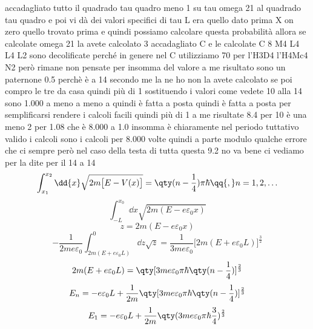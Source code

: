\begin{soluzione}
accadagliato tutto il quadrado tau quadro meno 1 su tau omega 21 al quadrado tau quadro e poi vi dà dei valori specifici di tau L era quello dato prima X on zero quello trovato prima e quindi possiamo calcolare questa probabilità allora se calcolate omega 21 la avete calcolato 3 accadagliato C e le calcolate C 8 M4 L4 L4 L2 sono decolificate perché in genere nel C utilizziamo 70 per l'H3D4 l'H4Mc4 N2 però rimane non pensate per insomma del valore a me risultato sono un paternone 0.5 perchè è a 14 secondo me la ne ho non la avete calcolato se poi compro le tre da casa quindi più di 1 sostituendo i valori come vedete 10 alla 14 sono 1.000 a meno a meno a quindi è fatta a posta quindi è fatta a posta per semplificarsi rendere i calcoli facili quindi più di 1 a me risultate 8.4 per 10 è una meno 2 per 1.08 che è 8.000 a 1.0 insomma è chiaramente nel periodo tuttativo valido i calcoli sono i calcoli per 8.000 volte quindi a parte modulo qualche errore che ci sempre però nel caso della testa di tutta questa 9.2 no va bene ci vediamo per la dite per il 14 a 14
   \begin{equation*}
      \int_{x_1}^{x_2} \dd{x} \sqrt{2m \bigl[ E - V(x) \bigr]}
      =\qty( n - \frac{1}{4} )\pi \hbar
      \qq{,}
      n=1,2,\ldots
   \end{equation*}
   \begin{equation*}
      \int_{-L}^{x_0} \dd{x} \sqrt{2m ( E - e \varepsilon_0 x )}
   \end{equation*}
   \begin{equation*}
      z=2m ( E - e \varepsilon_0 x )
   \end{equation*}
   \begin{equation*}
      -\frac{1}{2 m e \varepsilon_0} \int_{2m(E + e \varepsilon_0 L)}^{0} \dd{z} \sqrt{z}
      =\frac{1}{3 m e \varepsilon_0} \bigl[ 2m(E + e \varepsilon_0 L) \bigr]^{\frac{3}{2}}
   \end{equation*}
   \begin{equation*}
      2m(E + e \varepsilon_0 L)
      =\qty[ 3 m e \varepsilon_0 \pi \hbar \qty( n - \frac{1}{4} ) ]^{\frac{2}{3}}
   \end{equation*}
   \begin{equation*}
      E_n
      =-e \varepsilon_0 L + \frac{1}{2m} \qty[ 3 m e \varepsilon_0 \pi \hbar \qty( n - \frac{1}{4} ) ]^{\frac{2}{3}}
   \end{equation*}
   \begin{equation*}
      E_1
      =- e \varepsilon_0 L + \frac{1}{2m} \qty( 3 m e \varepsilon_0 \pi \hbar \frac{3}{4} )^{\frac{2}{3}}
   \end{equation*}
\end{soluzione}

\newpage
\setcounter{equation}{0}